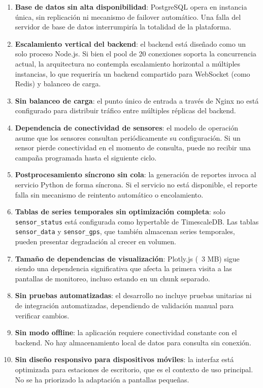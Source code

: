 \begin{enumerate}
    \item \textbf{Base de datos sin alta disponibilidad}: PostgreSQL opera en
    instancia única, sin replicación ni mecanismo de failover automático. Una
    falla del servidor de base de datos interrumpiría la totalidad de la
    plataforma.

    \item \textbf{Escalamiento vertical del backend}: el backend está diseñado
    como un solo proceso Node.js. Si bien el pool de 20 conexiones soporta la
    concurrencia actual, la arquitectura no contempla escalamiento horizontal
    a múltiples instancias, lo que requeriría un backend compartido para
    WebSocket (como Redis) y balanceo de carga.

    \item \textbf{Sin balanceo de carga}: el punto único de entrada a través
    de Nginx no está configurado para distribuir tráfico entre múltiples
    réplicas del backend.

    \item \textbf{Dependencia de conectividad de sensores}: el modelo de
    operación asume que los sensores consultan periódicamente su configuración.
    Si un sensor pierde conectividad en el momento de consulta, puede no
    recibir una campaña programada hasta el siguiente ciclo.

    \item \textbf{Postprocesamiento síncrono sin cola}: la generación de
    reportes invoca al servicio Python de forma síncrona. Si el servicio no
    está disponible, el reporte falla sin mecanismo de reintento automático o
    encolamiento.

    \item \textbf{Tablas de series temporales sin optimización completa}:
    solo \texttt{sensor\_status} está configurada como hypertable de
    TimescaleDB. Las tablas \texttt{sensor\_data} y \texttt{sensor\_gps},
    que también almacenan series temporales, pueden presentar degradación al
    crecer en volumen.

    \item \textbf{Tamaño de dependencias de visualización}: Plotly.js (~3 MB)
    sigue siendo una dependencia significativa que afecta la primera visita a
    las pantallas de monitoreo, incluso estando en un chunk separado.

    \item \textbf{Sin pruebas automatizadas}: el desarrollo no incluye pruebas
    unitarias ni de integración automatizadas, dependiendo de validación
    manual para verificar cambios.

    \item \textbf{Sin modo offline}: la aplicación requiere conectividad
    constante con el backend. No hay almacenamiento local de datos para
    consulta sin conexión.

    \item \textbf{Sin diseño responsivo para dispositivos móviles}: la
    interfaz está optimizada para estaciones de escritorio, que es el contexto
    de uso principal. No se ha priorizado la adaptación a pantallas pequeñas.
\end{enumerate}

